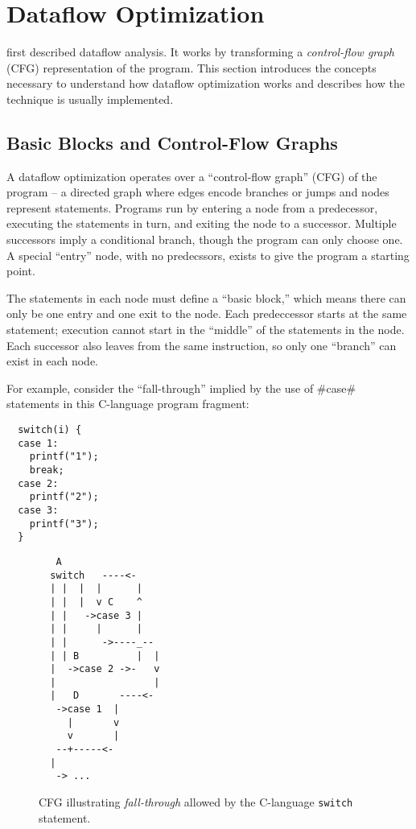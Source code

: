 \documentclass[12pt]{report}
\begin{document}

\section{Dataflow Optimization}

\citet{SoAndSo} first described dataflow
analysis. It works by transforming a \emph{control-flow graph} (CFG)
representation of the program. This section introduces the concepts
necessary to understand how dataflow optimization works and describes
how the technique is usually implemented.

\subsection{Basic Blocks and Control-Flow Graphs}

A dataflow optimization operates over a ``control-flow graph'' (CFG)
of the program -- a directed graph where edges encode branches or
jumps and nodes represent statements. Programs run by entering a node
from a predecessor, executing the statements in turn, and exiting the
node to a successor. Multiple successors imply a conditional branch,
though the program can only choose one. A special ``entry'' node, with
no predecssors, exists to give the program a starting point.

The statements in each node must define a ``basic block,'' which means
there can only be one entry and one exit to the node. Each 
predeccessor starts at the same statement; execution cannot start in
the ``middle'' of the statements in the node. Each successor also
leaves from the same instruction, so only one ``branch'' can exist in
each node.

For example, consider the ``fall-through'' implied by the use of #case#
statements in this C-language program fragment:

\begin{verbatim}
  switch(i) {
  case 1:
    printf("1");
    break;
  case 2:
    printf("2");
  case 3:
    printf("3");
  }
\end{verbatim}

\begin{figure}[h]
\begin{verbatim}
   A
  switch   ----<-
  | |  |  |      |
  | |  |  v C    ^
  | |   ->case 3 |
  | |     |      |
  | |      ->----_-- 
  | | B          |  |
  |  ->case 2 ->-   v
  |                 |
  |   D       ----<-
   ->case 1  |
     |       v
     v       |
   --+-----<-      
  |  
   -> ...
\end{verbatim}
\caption{CFG illustrating \emph{fall-through} allowed by the
  C-language \texttt{switch} statement.}
\label{switchCfgEg}
\end{figure}
\end{document}
